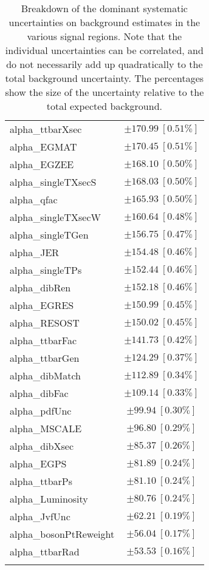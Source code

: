 \begin{table}
\begin{center}
\begin{tabular*}{\textwidth}{@{\extracolsep{\fill}}lc}
alpha\_ttbarXsec         & $\pm 170.99\ [0.51\%] $       \\
alpha\_EGMAT         & $\pm 170.45\ [0.51\%] $       \\
alpha\_EGZEE         & $\pm 168.10\ [0.50\%] $       \\
alpha\_singleTXsecS         & $\pm 168.03\ [0.50\%] $       \\
alpha\_qfac         & $\pm 165.93\ [0.50\%] $       \\
alpha\_singleTXsecW         & $\pm 160.64\ [0.48\%] $       \\
alpha\_singleTGen         & $\pm 156.75\ [0.47\%] $       \\
alpha\_JER         & $\pm 154.48\ [0.46\%] $       \\
alpha\_singleTPs         & $\pm 152.44\ [0.46\%] $       \\
alpha\_dibRen         & $\pm 152.18\ [0.46\%] $       \\
alpha\_EGRES         & $\pm 150.99\ [0.45\%] $       \\
alpha\_RESOST         & $\pm 150.02\ [0.45\%] $       \\
alpha\_ttbarFac         & $\pm 141.73\ [0.42\%] $       \\
alpha\_ttbarGen         & $\pm 124.29\ [0.37\%] $       \\
alpha\_dibMatch         & $\pm 112.89\ [0.34\%] $       \\
alpha\_dibFac         & $\pm 109.14\ [0.33\%] $       \\
alpha\_pdfUnc         & $\pm 99.94\ [0.30\%] $       \\
alpha\_MSCALE         & $\pm 96.80\ [0.29\%] $       \\
alpha\_dibXsec         & $\pm 85.37\ [0.26\%] $       \\
alpha\_EGPS         & $\pm 81.89\ [0.24\%] $       \\
alpha\_ttbarPs         & $\pm 81.10\ [0.24\%] $       \\
alpha\_Luminosity         & $\pm 80.76\ [0.24\%] $       \\
alpha\_JvfUnc         & $\pm 62.21\ [0.19\%] $       \\
alpha\_bosonPtReweight         & $\pm 56.04\ [0.17\%] $       \\
alpha\_ttbarRad         & $\pm 53.53\ [0.16\%] $       \\
\noalign{\smallskip}\hline\noalign{\smallskip}
\end{tabular*}
\end{center}
\caption[Breakdown of uncertainty on background estimates]{
Breakdown of the dominant systematic uncertainties on background estimates in the various signal regions.
Note that the individual uncertainties can be correlated, and do not necessarily add up quadratically to 
the total background uncertainty. The percentages show the size of the uncertainty relative to the total expected background.
\label{table.results.bkgestimate.uncertainties.SR}}
\end{table}
%